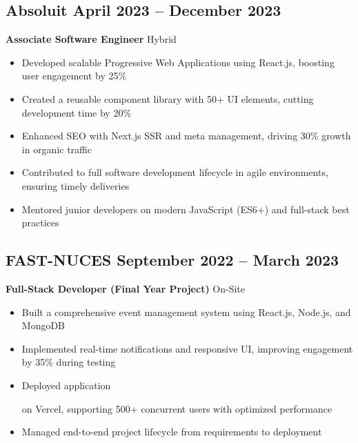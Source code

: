 \documentclass[11pt]{article}
\begin{document}
\subsection{\texorpdfstring{Absoluit \hfill April 2023 -- December 2023}{Absoluit, April 2023 -- December 2023}}
\textbf{Associate Software Engineer} \hfill Hybrid
\begin{itemize}
\item Developed scalable Progressive Web Applications using React.js, boosting user engagement by 25\%
\item Created a reusable component library with 50+ UI elements, cutting development time by 20\%
\item Enhanced SEO with Next.js SSR and meta management, driving 30\% growth in organic traffic
\item Contributed to full software development lifecycle in agile environments, ensuring timely deliveries
\item Mentored junior developers on modern JavaScript (ES6+) and full-stack best practices
\end{itemize}

\subsection{\texorpdfstring{FAST-NUCES \hfill September 2022 -- March 2023}{FAST-NUCES, September 2022 -- March 2023}}
\textbf{Full-Stack Developer (Final Year Project)} \hfill On-Site
\begin{itemize}
\item Built a comprehensive event management system using React.js, Node.js, and MongoDB
\item Implemented real-time notifications and responsive UI, improving engagement by 35\% during testing
\item Deployed application

 on Vercel, supporting 500+ concurrent users with optimized performance
\item Managed end-to-end project lifecycle from requirements to deployment
\end{itemize}

\end{document}
